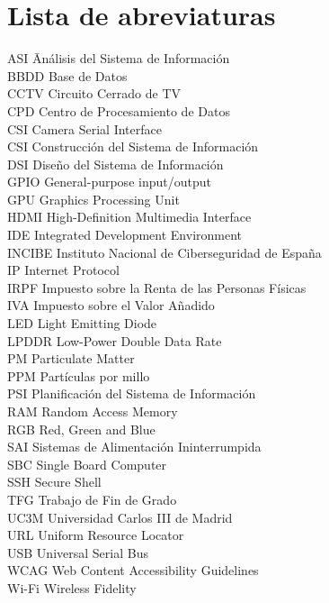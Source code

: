 \newpage %
\thispagestyle{empty}
\mbox{}

\chapter*{Lista de abreviaturas}
\begin{tabbing}  %
	ASI \quad\quad\quad\= Análisis del Sistema de Información \\
	BBDD \> Base de Datos \\
	CCTV \> Circuito Cerrado de TV \\
	CPD \>  Centro de Procesamiento de Datos \\
	CSI \> Camera Serial Interface \\
	CSI \> Construcción del Sistema de Información \\
	DSI \> Diseño del Sistema de Información \\
	GPIO \> General-purpose input/output \\
	GPU \> Graphics Processing Unit \\
	HDMI \> High-Definition Multimedia Interface \\
	IDE \> Integrated Development Environment \\
	INCIBE \> Instituto Nacional de Ciberseguridad de España \\
	IP \> Internet Protocol \\
	IRPF \> Impuesto sobre la Renta de las Personas Físicas \\
	IVA \>  Impuesto sobre el Valor Añadido \\
	LED \> Light Emitting Diode \\
	LPDDR \> Low-Power Double Data Rate \\
	PM \> Particulate Matter \\
	PPM \> Partículas por millo \\
	PSI \> Planificación del Sistema de Información \\
	RAM \> Random Access Memory \\
	RGB \> Red, Green and Blue \\
	SAI \> Sistemas de Alimentación Ininterrumpida \\
	SBC \> Single Board Computer \\
	SSH \> Secure Shell \\
	TFG \>  Trabajo de Fin de Grado \\
	UC3M  \>  Universidad Carlos III de Madrid \\
	URL \> Uniform Resource Locator \\
	USB \> Universal Serial Bus \\
	WCAG \> Web Content Accessibility Guidelines \\
	Wi-Fi \> Wireless Fidelity
\end{tabbing}